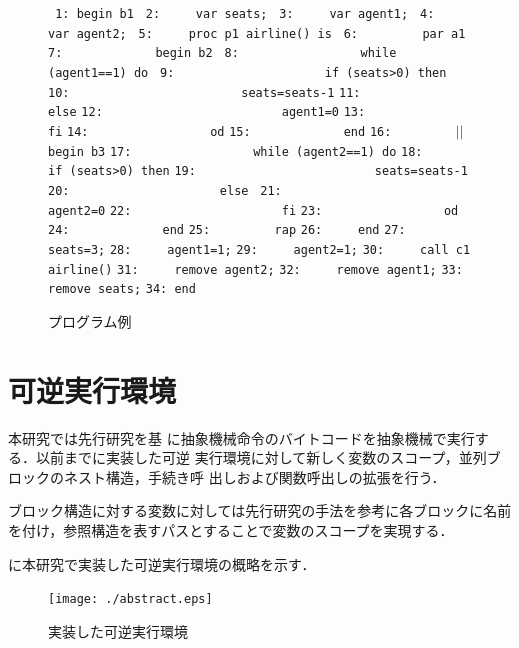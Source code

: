 \documentclass[submit,PRO]{ipsj}
\def\|{\verb|}
\begin{document}
\begin{figure}[tb]
\vbox{
\hbox{\| 1: begin b1|}
\hbox{\| 2:     var seats;|}
\hbox{\| 3:     var agent1;|}
\hbox{\| 4:     var agent2;|}
\hbox{\| 5:     proc p1 airline() is|}
\hbox{\| 6:         par a1 |}
\hbox{\| 7:             begin b2|}
\hbox{\| 8:                 while (agent1==1) do|}
\hbox{\| 9:                     if (seats>0) then|}
\hbox{\|10:                        seats=seats-1|}
\hbox{\|11:                     else|}
\hbox{\|12:                         agent1=0|}
\hbox{\|13:                     fi|}
\hbox{\|14:                 od|}
\hbox{\|15:             end|}
\hbox{\|16:         |$||$\|  begin b3|}
\hbox{\|17:                 while (agent2==1) do|}
\hbox{\|18:                     if (seats>0) then|}
\hbox{\|19:                         seats=seats-1|}
\hbox{\|20:                     else |}
\hbox{\|21:                         agent2=0|}
\hbox{\|22:                     fi|}
\hbox{\|23:                 od|}
\hbox{\|24:             end|}
\hbox{\|25:         rap|}
\hbox{\|26:     end|}
\hbox{\|27:     seats=3;|}
\hbox{\|28:     agent1=1;|}
\hbox{\|29:     agent2=1;|}
\hbox{\|30:     call c1 airline()|}
\hbox{\|31:     remove agent2;|}
\hbox{\|32:     remove agent1;|}
\hbox{\|33:     remove seats;|}
\hbox{\|34: end|}
}
\centerline{}
\caption{プログラム例}
\label{fig:sample}
\end{figure}



\section{可逆実行環境}
\label{config}

本研究では先行研究\cite{DBLP:journals/corr/abs-1808-08651,Hoey20PHD}を基
に抽象機械命令のバイトコードを抽象機械で実行する．以前までに実装した可逆
実行環境に対して新しく変数のスコープ，並列ブロックのネスト構造，手続き呼
出しおよび関数呼出しの拡張を行う．

ブロック構造に対する変数に対しては先行研究の手法を参考に各ブロックに名前
を付け，参照構造を表すパスとすることで変数のスコープを実現する．

に本研究で実装した可逆実行環境の概略を示す．

\begin{figure}[tb]
\texttt{[image: ./abstract.eps]}
\caption{実装した可逆実行環境}
\label{fig:abst}
\end{figure}
\end{document}

